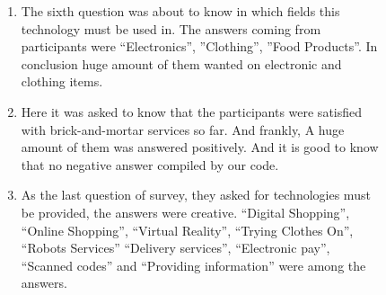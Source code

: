 \documentclass[letterpaper, 10 pt, conference]{ieeeconf}
\begin{document}
\begin{figure}[h!]
\begin{enumerate}
  \item The sixth question was about to know in which fields this technology must be used in. The answers coming from participants were “Electronics”, ”Clothing”, ”Food Products”. In conclusion huge amount of them wanted on electronic and clothing items.\\
  \item Here it was asked to know that the participants were satisfied with brick-and-mortar services so far. And frankly, A huge amount of them was answered positively. And it is good to know that no negative answer compiled by our code.\\
  \item As the last question of survey, they asked for technologies must be provided, the answers were creative. “Digital Shopping”, “Online Shopping”, “Virtual Reality”, “Trying Clothes On”, “Robots Services” “Delivery services”, “Electronic pay”, “Scanned codes” and “Providing information” were among the answers.\\


\end{enumerate}
\end{figure}
\end{document}
